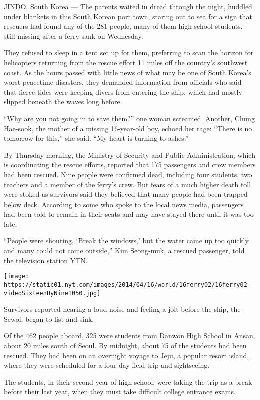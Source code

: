 JINDO, South Korea --- The parents waited in dread through the night,
huddled under blankets in this South Korean port town, staring out to
sea for a sign that rescuers had found any of the 281 people, many of
them high school students, still missing after a ferry sank on
Wednesday.

They refused to sleep in a tent set up for them, preferring to scan the
horizon for helicopters returning from the rescue effort 11 miles off
the country's southwest coast. As the hours passed with little news of
what may be one of South Korea's worst peacetime disasters, they
demanded information from officials who said that fierce tides were
keeping divers from entering the ship, which had mostly slipped beneath
the waves long before.

``Why are you not going in to save them?'' one woman screamed. Another,
Chung Hae-sook, the mother of a missing 16-year-old boy, echoed her
rage: ``There is no tomorrow for this,'' she said. ``My heart is turning
to ashes.''

By Thursday morning, the Ministry of Security and Public Administration,
which is coordinating the rescue efforts, reported that 175 passengers
and crew members had been rescued. Nine people were confirmed dead,
including four students, two teachers and a member of the ferry's crew.
But fears of a much higher death toll were stoked as survivors said they
believed that many people had been trapped below deck. According to some
who spoke to the local news media, passengers had been told to remain in
their seats and may have stayed there until it was too late.

``People were shouting, `Break the windows,' but the water came up too
quickly and many could not come outside,'' Kim Seong-muk, a rescued
passenger, told the television station YTN.

\texttt{[image: https://static01.nyt.com/images/2014/04/16/world/16ferry02/16ferry02-videoSixteenByNine1050.jpg]}

Survivors reported hearing a loud noise and feeling a jolt before the
ship, the Sewol, began to list and sink.

Of the 462 people aboard, 325 were students from Danwon High School in
Ansan, about 20 miles south of Seoul. By midnight, about 75 of the
students had been rescued. They had been on an overnight voyage to Jeju,
a popular resort island, where they were scheduled for a four-day field
trip and sightseeing.

The students, in their second year of high school, were taking the trip
as a break before their last year, when they must take difficult college
entrance exams.

